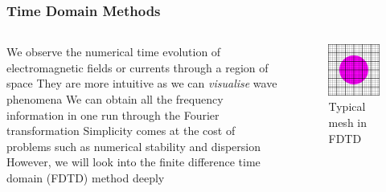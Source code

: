 \documentclass[10pt]{beamer}
\begin{document}
\begin{frame}
    \frametitle{Time Domain Methods}


    \begin{columns}[T] %
        \begin{column}{.6\textwidth}
            \begin{outline}
                \1 We observe the numerical time evolution of electromagnetic fields or currents through a region of space
                \1 They are more intuitive as we can \textit{visualise} wave phenomena
                \1 We can obtain all the frequency information in one run through the Fourier transformation
                \1 Simplicity comes at the cost of problems such as numerical stability and dispersion
                \1 However, we will look into the finite difference time domain (FDTD) method deeply
            \end{outline}
        \end{column}
        \begin{column}{.4\textwidth}
            \begin{figure}[B!]
                \centering
                \includegraphics[width=1\textwidth]{fdtd mesh.pdf}
                \caption{Typical mesh in FDTD}
            \end{figure}
        \end{column}%
    \end{columns}
\end{frame}
\end{document}
